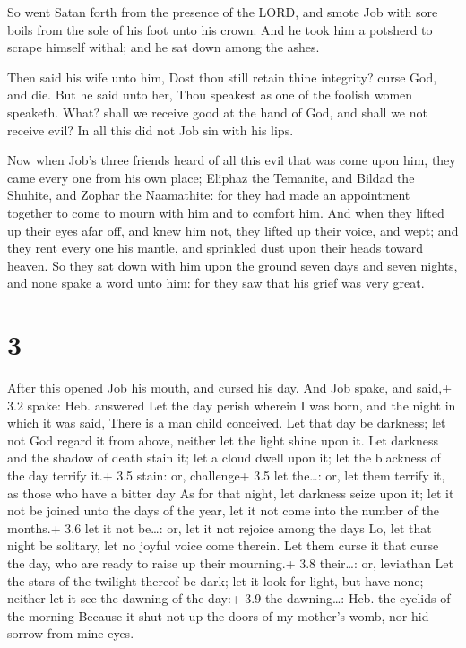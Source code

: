  So went Satan forth from the presence of the LORD, and
smote Job with sore boils from the sole of his foot unto his crown.
 And he took him a potsherd to scrape himself withal; and he
sat down among the ashes.

 Then said his wife unto him, Dost thou still retain thine
integrity? curse God, and die.  But he said unto her, Thou
speakest as one of the foolish women speaketh. What? shall we receive
good at the hand of God, and shall we not receive evil? In all this did
not Job sin with his lips.

 Now when Job's three friends heard of all this evil that
was come upon him, they came every one from his own place; Eliphaz the
Temanite, and Bildad the Shuhite, and Zophar the Naamathite: for they
had made an appointment together to come to mourn with him and to
comfort him.  And when they lifted up their eyes afar off,
and knew him not, they lifted up their voice, and wept; and they rent
every one his mantle, and sprinkled dust upon their heads toward heaven.
 So they sat down with him upon the ground seven days and
seven nights, and none spake a word unto him: for they saw that his
grief was very great.

\hypertarget{section-2}{%
\section{3}\label{section-2}}

 After this opened Job his mouth, and cursed his day.
 And Job spake, and said,+ 3.2 spake: Heb. answered
 Let the day perish wherein I was born, and the night in
which it was said, There is a man child conceived.  Let that
day be darkness; let not God regard it from above, neither let the light
shine upon it.  Let darkness and the shadow of death stain
it; let a cloud dwell upon it; let the blackness of the day terrify it.+
3.5 stain: or, challenge+ 3.5 let the\ldots: or, let them terrify it, as
those who have a bitter day  As for that night, let darkness
seize upon it; let it not be joined unto the days of the year, let it
not come into the number of the months.+ 3.6 let it not be\ldots: or,
let it not rejoice among the days  Lo, let that night be
solitary, let no joyful voice come therein.  Let them curse
it that curse the day, who are ready to raise up their mourning.+ 3.8
their\ldots: or, leviathan  Let the stars of the twilight
thereof be dark; let it look for light, but have none; neither let it
see the dawning of the day:+ 3.9 the dawning\ldots: Heb. the eyelids of
the morning  Because it shut not up the doors of my
mother's womb, nor hid sorrow from mine eyes.

